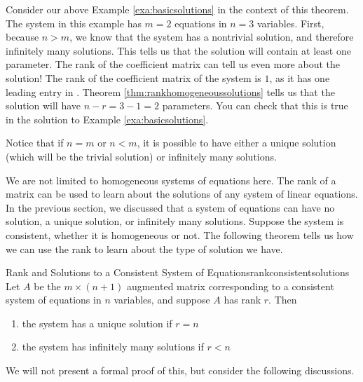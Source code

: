 Consider our above Example \ref{exa:basicsolutions} in the context of
this theorem. The system in this example has $m = 2$ equations in $n =
3$ variables.  First, because $n>m$, we know that the system has a
nontrivial solution, and therefore infinitely many solutions. This
tells us that the solution will contain at least one parameter. The
rank of the coefficient matrix can tell us even more about the
solution! The rank of the coefficient matrix of the system is $1$, as
it has one leading entry in {\ef}. Theorem \ref{thm:rankhomogeneoussolutions} tells us that the
solution will have $n-r = 3-1 = 2$ parameters. You can check that this
is true in the solution to Example \ref{exa:basicsolutions}.

Notice that if $n=m$ or $n<m$, it is possible to have either a unique solution (which will be the trivial solution) or infinitely many solutions. 

We are not limited to homogeneous systems of equations here. The rank of a matrix can be used to learn about the 
solutions of any system of linear equations. 
In the previous section, we discussed that a system of equations can have no solution, a unique solution, or infinitely many solutions.
Suppose the system is consistent, whether it is homogeneous or not. The following theorem tells us
how we can use the rank to learn about the type of solution we have. 

\begin{theorem}{Rank and Solutions to a Consistent System of Equations}{rankconsistentsolutions}
Let $A$ be the $m \times \left( n+1 \right) $ augmented matrix corresponding to a consistent system of equations in $n$ variables, and suppose $A$ has rank $r$.
Then
\begin{enumerate}
\item the system has a unique solution if $r = n $
\item the system has infinitely many solutions if $r < n$
\end{enumerate}
\end{theorem}

We will not present a formal proof of this, but consider the following discussions. 

